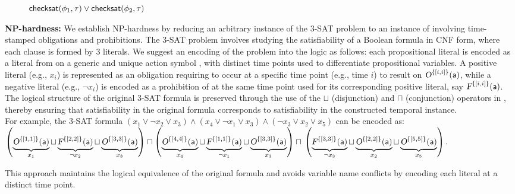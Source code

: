 \begin{proofsketch}
\begin{figure}[h]
\begin{minipage}{0.9\textwidth}
\begin{algorithm}[H]
{{        \Return $\mathsf{checksat}(\phi_1,\tau) \vee \mathsf{checksat}(\phi_2,\tau)$
        
           
        }  
    }
\end{algorithm}
\end{minipage}
\end{figure}

\textbf{NP-hardness:} We establish NP-hardness by reducing an arbitrary instance of the 3-SAT problem to an instance of \TDDLfm involving time-stamped obligations and prohibitions. The 3-SAT problem involves studying the satisfiability of a Boolean formula in CNF form, where each clause is formed by 3 literals. We suggest an encoding of the problem into the logic as follows: each propositional literal is encoded as a literal from \TDDLfm on a generic and unique action symbol \acta, with distinct time points used to differentiate propositional variables. A positive literal (e.g., $x_i$) is represented as an obligation requiring \acta to occur at a specific time point (e.g., time $i$) to result on $\textsl{O}^{\{[i,i]\}}(\mathsf{a})$, while a negative literal (e.g., $\lnot x_i$) is encoded as a prohibition of \acta at the same time point used for its corresponding positive literal, say $\textsl{F}^{\{[i,i]\}}(\mathsf{a})$. The logical structure of the original 3-SAT formula is preserved through the use of the $\sqcup$ (disjunction) and $\sqcap$ (conjunction) operators in \TDDLfm, thereby ensuring that satisfiability in the original formula corresponds to satisfiability in the constructed temporal instance.\\ For example, the 3-SAT formula \(( x_1 \vee \lnot x_2 \vee  x_3) \wedge (x_4  \vee \lnot x_1\vee x_3) \wedge (\lnot x_3 \vee x_2 \vee x_5) \) can be encoded as:
\\$
\left(
    \underbrace{\textsl{O}^{\{[1,1]\}}(\mathsf{a})}_{\text{$x_1$}} 
    \sqcup 
    \underbrace{\textsl{F}^{\{[2,2]\}}(\mathsf{a})}_{\text{$\lnot x_2$}} 
    \sqcup 
    \underbrace{\textsl{O}^{\{[3,3]\}}(\mathsf{a})}_{\text{$x_3$}}
\right)
\sqcap
\left(
    \underbrace{\textsl{O}^{\{[4,4]\}}(\mathsf{a})}_{\text{$x_4$}} 
    \sqcup 
    \underbrace{\textsl{F}^{\{[1,1]\}}(\mathsf{a})}_{\text{$\lnot x_1$}} 
    \sqcup 
    \underbrace{\textsl{O}^{\{[3,3]\}}(\mathsf{a})}_{\text{$x_3$}}
\right)
\sqcap\\
\left(
    \underbrace{\textsl{F}^{\{[3,3]\}}(\mathsf{a})}_{\text{$\lnot x_3$}} 
    \sqcup 
    \underbrace{\textsl{O}^{\{[2,2]\}}(\mathsf{a})}_{\text{$x_2$}} 
    \sqcup 
    \underbrace{\textsl{O}^{\{[5,5]\}}(\mathsf{a})}_{\text{$x_5$}}
\right). 
$


      


This approach maintains the logical equivalence of the original formula and avoids variable name conflicts by encoding each literal at a distinct time point.


\end{proofsketch}
